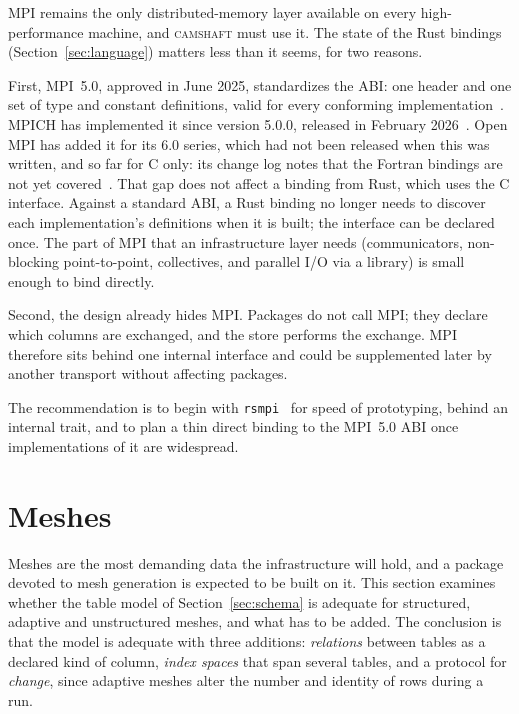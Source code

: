 \documentclass[11pt,a4paper]{article}
\newcommand{\camshaft}{\textsc{camshaft}}
\newcommand{\code}[1]{\texttt{#1}}
\begin{document}
MPI remains the only distributed-memory layer available on every
high-performance machine, and \camshaft{} must use it.  The state of the Rust
bindings (Section~\ref{sec:language}) matters less than it seems, for two
reasons.

First, MPI~5.0, approved in June 2025, standardizes the ABI: one header and
one set of type and constant definitions, valid for every conforming
implementation~\cite{mpi50,mpiabi}.  MPICH has implemented it since version
5.0.0, released in February 2026~\cite{mpich5}.  Open MPI has added it for
its 6.0 series, which had not been released when this was written, and so
far for C only: its change log notes that the Fortran bindings are not yet
covered~\cite{ompi6}.  That gap does not affect a binding from Rust, which
uses the C interface.  Against a standard
ABI, a Rust binding no longer needs to discover each implementation's
definitions when it is built; the interface can be declared once.  The part of
MPI that an infrastructure layer needs (communicators, non-blocking
point-to-point, collectives, and parallel I/O via a library) is small enough
to bind directly.

Second, the design already hides MPI.  Packages do not call MPI; they declare
which columns are exchanged, and the store performs the exchange.  MPI
therefore sits behind one internal interface and could be supplemented later
by another transport without affecting packages.

The recommendation is to begin with \code{rsmpi}~\cite{rsmpi} for speed of
prototyping, behind an internal trait, and to plan a thin direct binding to
the MPI~5.0 ABI once implementations of it are widespread.

\section{Meshes}
\label{sec:mesh}

Meshes are the most demanding data the infrastructure will hold, and a
package devoted to mesh generation is expected to be built on it.  This
section examines whether the table model of Section~\ref{sec:schema} is
adequate for structured, adaptive and unstructured meshes, and what has to be
added.  The conclusion is that the model is adequate with three additions:
\emph{relations} between tables as a declared kind of column, \emph{index
spaces} that span several tables, and a protocol for \emph{change}, since
adaptive meshes alter the number and identity of rows during a run.
\end{document}
